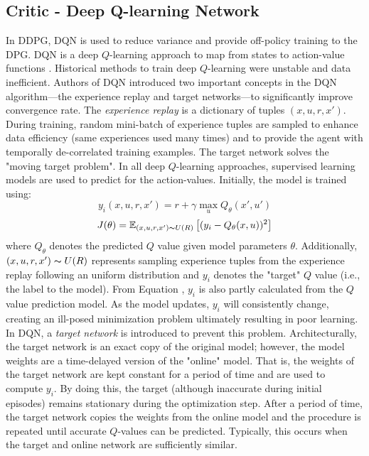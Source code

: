 \subsection{Critic - Deep Q-learning Network}
In DDPG, DQN is used to reduce variance and provide off-policy training to the DPG. DQN is a deep $Q$-learning approach to map from states to action-value functions \cite{dqn1, dqn2}. Historical methods to train deep $Q$-learning were unstable and data inefficient. Authors of DQN introduced two important concepts in the DQN algorithm---the experience replay and target networks---to significantly improve convergence rate. The \textit{experience replay} is a dictionary of tuples $(x, u, r, x')$.  During training, random mini-batch of experience tuples are sampled to enhance data efficiency (same experiences used many times) and to provide the agent with temporally de-correlated training examples. The target network solves the "moving target problem".  In all deep $Q$-learning approaches, supervised learning models are used to predict for the action-values.  Initially, the model is trained using:
\begin{equation}
    y_i(x, u, r, x') = r + \gamma \max_u Q_{\theta}(x', u')
    \label{eq:01tdtarget}
\end{equation}
\begin{equation}
    J(\theta) = \mathbb{E}_{(x, u, r, x') \thicksim U(R)}\left[(y_i - Q_{\theta}(x, u))^2     \right]
\end{equation}
where $Q_{\theta}$ denotes the predicted $Q$ value given model parameters $\theta$.  Additionally, $(x, u, r, x') \thicksim U(R)$ represents sampling experience tuples from the experience replay following an uniform distribution and $y_i$ denotes the "target" $Q$ value (i.e., the label to the model). From Equation \label{eq:01tdtarget}, $y_i$ is also partly calculated from the $Q$ value prediction model. As the model updates, $y_i$ will consistently change, creating an ill-posed minimization problem ultimately resulting in poor learning.  In DQN, a \textit{target network} is introduced to prevent this problem.  Architecturally, the target network is an exact copy of the original model; however, the model weights are a time-delayed version of the "online" model.  That is, the weights of the target network are kept constant for a period of time and are used to compute $y_i$.  By doing this, the target (although inaccurate during initial episodes) remains stationary during the optimization step.  After a period of time, the target network copies the weights from the online model and the procedure is repeated until accurate $Q$-values can be predicted.  Typically, this occurs when the target and online network are sufficiently similar.

